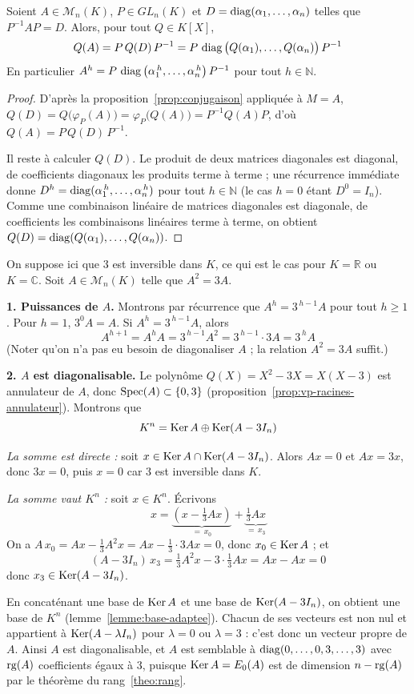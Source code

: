 \begin{coro}
\label{coro:puissances}
Soient $A\in\mathcal{M}_n(K)$, $P\in GL_n(K)$ et $D=\operatorname{diag}(\alpha_1,\dots,\alpha_n)$ telles que $P^{-1}AP=D$. Alors, pour tout $Q\in K[X]$,
\[Q(A) = P\,Q(D)\,P^{-1} = P\,\operatorname{diag}\big(Q(\alpha_1),\dots,Q(\alpha_n)\big)\,P^{-1}\]
En particulier $A^h = P\,\operatorname{diag}\big(\alpha_1^{\,h},\dots,\alpha_n^{\,h}\big)\,P^{-1}$ pour tout $h\in\mathbb{N}$.
\end{coro}

\begin{proof}
D'après la proposition~\ref{prop:conjugaison} appliquée à $M=A$, $Q(D)=Q\big(\varphi_P(A)\big)=\varphi_P\big(Q(A)\big)=P^{-1}Q(A)P$, d'où $Q(A)=P\,Q(D)\,P^{-1}$.

Il reste à calculer $Q(D)$. Le produit de deux matrices diagonales est diagonal, de coefficients diagonaux les produits terme à terme ; une récurrence immédiate donne $D^h=\operatorname{diag}(\alpha_1^{\,h},\dots,\alpha_n^{\,h})$ pour tout $h\in\mathbb{N}$ (le cas $h=0$ étant $D^0=I_n$). Comme une combinaison linéaire de matrices diagonales est diagonale, de coefficients les combinaisons linéaires terme à terme, on obtient $Q(D)=\operatorname{diag}(Q(\alpha_1),\dots,Q(\alpha_n))$.
\end{proof}

\begin{exemple}
On suppose ici que $3$ est inversible dans $K$, ce qui est le cas pour $K=\mathbb{R}$ ou $K=\mathbb{C}$. Soit $A\in\mathcal{M}_n(K)$ telle que $A^2=3A$.

\textbf{1. Puissances de $A$.} Montrons par récurrence que $A^h=3^{\,h-1}A$ pour tout $h\geq 1$. Pour $h=1$, $3^0A=A$. Si $A^h=3^{\,h-1}A$, alors
\[A^{h+1} = A^h A = 3^{\,h-1}A^2 = 3^{\,h-1}\cdot 3A = 3^{\,h}A\]
(Noter qu'on n'a pas eu besoin de diagonaliser $A$ ; la relation $A^2=3A$ suffit.)

\textbf{2. $A$ est diagonalisable.} Le polynôme $Q(X)=X^2-3X=X(X-3)$ est annulateur de $A$, donc $\operatorname{Spec}(A)\subset\{0,3\}$ (proposition~\ref{prop:vp-racines-annulateur}). Montrons que
\[K^n = \operatorname{Ker} A \oplus \operatorname{Ker}(A-3I_n)\]

\emph{La somme est directe :} soit $x\in\operatorname{Ker} A\cap\operatorname{Ker}(A-3I_n)$. Alors $Ax=0$ et $Ax=3x$, donc $3x=0$, puis $x=0$ car $3$ est inversible dans $K$.

\emph{La somme vaut $K^n$ :} soit $x\in K^n$. Écrivons
\[x = \underbrace{\left(x-\tfrac{1}{3}Ax\right)}_{=\,x_0} + \underbrace{\tfrac{1}{3}Ax}_{=\,x_3}\]
On a $A\,x_0 = Ax-\tfrac{1}{3}A^2x = Ax-\tfrac{1}{3}\cdot 3Ax = 0$, donc $x_0\in\operatorname{Ker} A$ ; et
\[(A-3I_n)\,x_3 = \tfrac{1}{3}A^2x - 3\cdot\tfrac{1}{3}Ax = Ax - Ax = 0\]
donc $x_3\in\operatorname{Ker}(A-3I_n)$.

En concaténant une base de $\operatorname{Ker} A$ et une base de $\operatorname{Ker}(A-3I_n)$, on obtient une base de $K^n$ (lemme~\ref{lemme:base-adaptee}). Chacun de ses vecteurs est non nul et appartient à $\operatorname{Ker}(A-\lambda I_n)$ pour $\lambda=0$ ou $\lambda=3$ : c'est donc un vecteur propre de $A$. Ainsi $A$ est diagonalisable, et $A$ est semblable à $\operatorname{diag}(0,\dots,0,3,\dots,3)$ avec $\operatorname{rg}(A)$ coefficients égaux à $3$, puisque $\operatorname{Ker} A=E_0(A)$ est de dimension $n-\operatorname{rg}(A)$ par le théorème du rang~\ref{theo:rang}.
\end{exemple}
